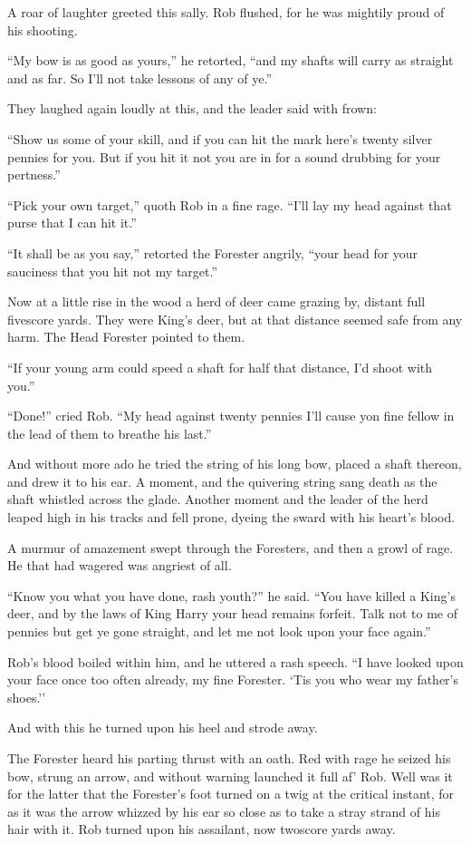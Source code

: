 A roar of laughter greeted this sally. Rob flushed, for he was mightily
proud of his shooting.

``My bow is as good as yours,'' he retorted, ``and my shafts will carry
as straight and as far. So I'll not take lessons of any of ye.''

They laughed again loudly at this, and the leader said with frown:

``Show us some of your skill, and if you can hit the mark here's twenty
silver pennies for you. But if you hit it not you are in for a sound
drubbing for your pertness.''

``Pick your own target,'' quoth Rob in a fine rage. ``I'll lay my head
against that purse that I can hit it.''

``It shall be as you say,'' retorted the Forester angrily, ``your head
for your sauciness that you hit not my target.''

Now at a little rise in the wood a herd of deer came grazing by, distant
full fivescore yards. They were King's deer, but at that distance seemed
safe from any harm. The Head Forester pointed to them.

``If your young arm could speed a shaft for half that distance, I'd
shoot with you.''

``Done!'' cried Rob. ``My head against twenty pennies I'll cause yon
fine fellow in the lead of them to breathe his last.''

And without more ado he tried the string of his long bow, placed a shaft
thereon, and drew it to his ear. A moment, and the quivering string sang
death as the shaft whistled across the glade. Another moment and the
leader of the herd leaped high in his tracks and fell prone, dyeing the
sward with his heart's blood.

A murmur of amazement swept through the Foresters, and then a growl of
rage. He that had wagered was angriest of all.

``Know you what you have done, rash youth?'' he said. ``You have killed
a King's deer, and by the laws of King Harry your head remains forfeit.
Talk not to me of pennies but get ye gone straight, and let me not look
upon your face again.''

Rob's blood boiled within him, and he uttered a rash speech. ``I have
looked upon your face once too often already, my fine Forester. `Tis you
who wear my father's shoes.''

And with this he turned upon his heel and strode away.

The Forester heard his parting thrust with an oath. Red with rage he
seized his bow, strung an arrow, and without warning launched it full
af' Rob. Well was it for the latter that the Forester's foot turned on a
twig at the critical instant, for as it was the arrow whizzed by his ear
so close as to take a stray strand of his hair with it. Rob turned upon
his assailant, now twoscore yards away.

